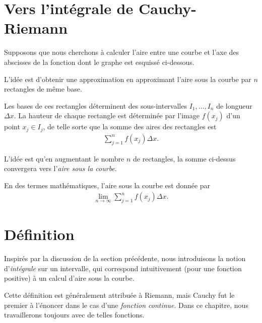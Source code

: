 \documentclass[main.tex]{subfiles}
\begin{document}
\section{Vers l'intégrale de Cauchy-Riemann}

Supposons que nous cherchons à calculer l'aire entre une courbe et l'axe des abscisses
de la fonction dont le graphe est esquissé ci-dessous.
\begin{plot}{0.5}{-1}{-1}{7}{7}
\end{plot}

L'idée est d'obtenir une approximation en approximant l'aire sous la courbe
par $n$ rectangles de même base.
\begin{plot}{0.5}{-2}{-1}{7}{7}
\end{plot}
Les bases de ces rectangles déterminent des sous-intervalles $I_1, \dots, I_n$ de longueur $\Delta x$.
La hauteur de chaque rectangle est déterminée par l'image $f(x_j)$ d'un point $x_j \in I_j$,
de telle sorte que la somme des aires des rectangles est
\begin{align}
    \sum_{j = 1}^n f(x_j) \Delta x.
\end{align}

L'idée est qu'en augmentant le nombre $n$ de rectangles,
la somme ci-dessus convergera vers l'\emph{aire sous la courbe}.
\begin{plot}{0.5}{-2}{-1}{7}{7}
\end{plot}
En des termes mathématiques,
l'aire sous la courbe est donnée par
\begin{align}
    \lim_{n \to \infty} \sum_{j = 1}^n f(x_j) \Delta x.
\end{align}

\section{Définition}

Inspirés par la discussion de la section précédente,
nous introduisons la notion d'\emph{intégrale} sur un intervalle,
qui correspond intuitivement (pour une fonction positive) à un calcul d'aire sous la courbe.

Cette définition est généralement attribuée à Riemann,
mais Cauchy fut le premier à l'énoncer dans le cas d'une \emph{fonction continue}.
Dans ce chapitre,
nous travaillerons toujours avec de telles fonctions.
\end{document}
